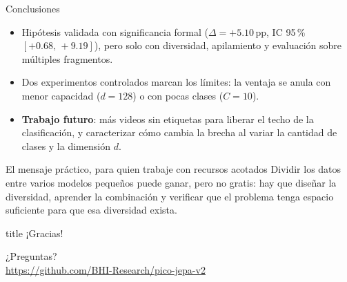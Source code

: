 \documentclass[aspectratio=169,10pt]{beamer}
\begin{document}
\begin{frame}{Conclusiones}
  \small
  \begin{itemize}
    \item Hipótesis \alert{validada con significancia formal}
          ($\Delta = +5.10$\,pp, IC 95\,\% $[+0.68,\, +9.19]$), pero solo
          con \alert{diversidad}, \alert{apilamiento} y evaluación sobre
          múltiples fragmentos.
    \item Dos experimentos controlados marcan los límites: la ventaja se
          anula con menor capacidad ($d{=}128$) o con pocas clases
          ($C{=}10$).
    \item \textbf{Trabajo futuro}: más videos sin etiquetas para liberar el
          techo de la clasificación, y caracterizar cómo cambia la brecha al
          variar la cantidad de clases y la dimensión $d$.
  \end{itemize}

  \vfill
  \begin{block}{El mensaje práctico, para quien trabaje con recursos acotados}
    Dividir los datos entre varios modelos pequeños \alert{puede ganar,
    pero no gratis}: hay que diseñar la diversidad, aprender la combinación
    y verificar que el problema tenga espacio suficiente para que esa
    diversidad exista.
  \end{block}
\end{frame}

\begin{frame}
  \begin{center}
    \begin{beamercolorbox}[sep=8pt,center]{title}
      \Large{¡Gracias!}
    \end{beamercolorbox}
    \vspace{1em}
    \huge{¿Preguntas?}\\
    \vspace{1.5em}
    \small{\url{https://github.com/BHI-Research/pico-jepa-v2}}
  \end{center}
\end{frame}

\appendix
\end{document}
